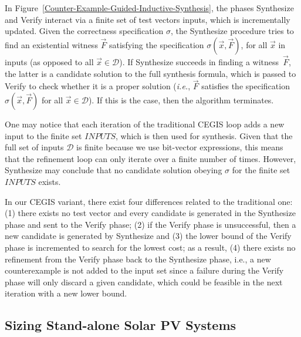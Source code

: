 \documentclass[runningheads]{llncs}
\begin{document}
In Figure~\ref{Counter-Example-Guided-Inductive-Synthesis}, the phases {\sc Synthesize} and {\sc Verify} interact via a finite set of test vectors {\sc inputs}, which is incrementally updated. Given the correctness specification $\sigma$, the {\sc Synthesize} procedure tries to find an existential witness $\vec{F}$ satisfying the specification $\sigma(\vec{x}, \vec{F})$, for all $\vec{x}$ in {\sc inputs} (as opposed to all $\vec{x} \in \mathcal{D}$). If {\sc Synthesize} succeeds in finding a witness~$\vec{F}$, the latter is a candidate solution to the full synthesis formula, which is passed to {\sc Verify} to check whether it is a proper solution ({\it i.e.}, $\vec{F}$ satisfies the specification $\sigma(\vec{x}, \vec{F})$ for all $\vec{x}\in\mathcal{D}$). If this is the case, then the algorithm terminates.

One may notice that each iteration of the traditional CEGIS loop adds a new input to the finite set $INPUTS$, which is then used for synthesis. Given that the full set of inputs $\mathcal{D}$ is finite because we use bit-vector expressions, this means that the refinement loop can only iterate over a finite number of times. However, {\sc Synthesize} may conclude that no candidate solution obeying $\sigma$ for the finite set $INPUTS$ exists. %

In our CEGIS variant, there exist four differences related to the traditional one: 
(1) there exists no test vector and every candidate is generated in the {\sc Synthesize} phase and sent to the {\sc Verify} phase; 
(2) if the {\sc Verify} phase is unsuccessful, then a new candidate is generated by {\sc Synthesize} and 
(3) the lower bound of the {\sc Verify} phase is incremented to search for the lowest cost; as a result,
(4) there exists no refinement from the {\sc Verify} phase back to the {\sc Synthesize} phase, i.e., a new counterexample is not added to the {\sc input} set since a failure during the {\sc Verify} phase will only discard a given candidate, which could be feasible in the next iteration with a new lower bound.

\subsection{Sizing Stand-alone Solar PV Systems}
\label{sec:sizing}
\end{document}
